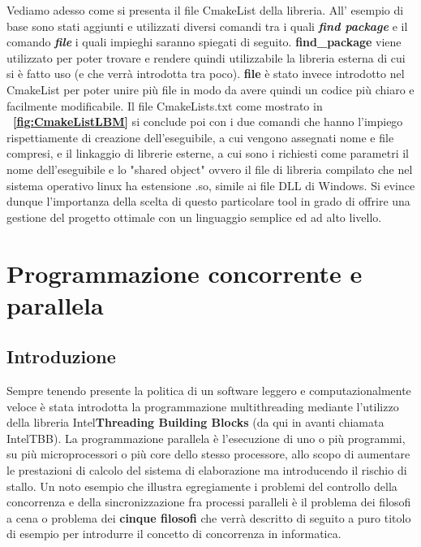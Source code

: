 {Vediamo adesso come si presenta il file CmakeList della libreria.  All' esempio di base sono stati aggiunti e utilizzati diversi comandi tra i quali \textbf{\textit{find package}} e il comando \textbf{\textit{file}} i quali impieghi saranno spiegati di seguito.
\textbf{find\_package} viene utilizzato per poter trovare e rendere quindi utilizzabile la libreria esterna di cui si \`e fatto uso (e che verr\`a introdotta tra poco).
\textbf{file} \`e stato invece introdotto nel CmakeList per poter unire pi\`u file in modo da avere quindi un codice pi\`u chiaro e facilmente modificabile.
Il file CmakeLists.txt come mostrato in \textbf{\figurename~\ref{fig:CmakeListLBM}} si conclude poi con i due comandi che hanno l'impiego rispettiamente di creazione dell'eseguibile, a cui vengono assegnati nome e file compresi, e il linkaggio di librerie esterne, a cui sono i richiesti come parametri il nome dell'eseguibile e lo "shared object" ovvero il file di libreria compilato che nel sistema operativo linux ha estensione .so, simile ai file DLL di Windows.  
Si evince dunque l'importanza della scelta di questo particolare tool in grado di offrire una gestione del progetto ottimale con un linguaggio semplice ed ad alto livello.

\section{Programmazione concorrente e parallela}
\subsection{Introduzione}
Sempre tenendo presente la politica di un software leggero e computazionalmente veloce \`e stata introdotta la programmazione multithreading mediante l'utilizzo della libreria Intel\textregistered \textbf{Threading Building Blocks} \cite{TBB:07} (da qui in avanti chiamata IntelTBB). La programmazione parallela \`e l'esecuzione di uno o pi\`u programmi, su pi\`u microprocessori o pi\`u core dello stesso processore, allo scopo di aumentare le prestazioni di calcolo del sistema di elaborazione ma introducendo il rischio di stallo. Un noto esempio che illustra egregiamente i problemi del controllo della concorrenza e della sincronizzazione fra processi paralleli \`e il problema dei filosofi a cena o problema dei \textbf{cinque filosofi} che verr\`a descritto di seguito a puro titolo di esempio per introdurre il concetto di concorrenza in informatica.
}
